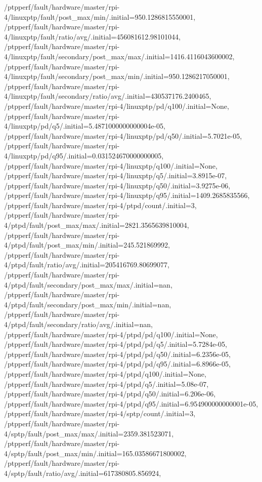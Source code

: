 {    /ptpperf/fault/hardware/master/rpi-4/linuxptp/fault/post_max/min/.initial=950.1286815550001,
    /ptpperf/fault/hardware/master/rpi-4/linuxptp/fault/ratio/avg/.initial=456081612.98101044,
    /ptpperf/fault/hardware/master/rpi-4/linuxptp/fault/secondary/post_max/max/.initial=1416.4116043600002,
    /ptpperf/fault/hardware/master/rpi-4/linuxptp/fault/secondary/post_max/min/.initial=950.1286217050001,
    /ptpperf/fault/hardware/master/rpi-4/linuxptp/fault/secondary/ratio/avg/.initial=430537176.2400465,
    /ptpperf/fault/hardware/master/rpi-4/linuxptp/pd/q100/.initial=None,
    /ptpperf/fault/hardware/master/rpi-4/linuxptp/pd/q5/.initial=5.4871000000000004e-05,
    /ptpperf/fault/hardware/master/rpi-4/linuxptp/pd/q50/.initial=5.7021e-05,
    /ptpperf/fault/hardware/master/rpi-4/linuxptp/pd/q95/.initial=0.031524670000000005,
    /ptpperf/fault/hardware/master/rpi-4/linuxptp/q100/.initial=None,
    /ptpperf/fault/hardware/master/rpi-4/linuxptp/q5/.initial=3.8915e-07,
    /ptpperf/fault/hardware/master/rpi-4/linuxptp/q50/.initial=3.9275e-06,
    /ptpperf/fault/hardware/master/rpi-4/linuxptp/q95/.initial=1409.2685835566,
    /ptpperf/fault/hardware/master/rpi-4/ptpd/count/.initial=3,
    /ptpperf/fault/hardware/master/rpi-4/ptpd/fault/post_max/max/.initial=2821.3565639810004,
    /ptpperf/fault/hardware/master/rpi-4/ptpd/fault/post_max/min/.initial=245.521869992,
    /ptpperf/fault/hardware/master/rpi-4/ptpd/fault/ratio/avg/.initial=205416769.80699077,
    /ptpperf/fault/hardware/master/rpi-4/ptpd/fault/secondary/post_max/max/.initial=nan,
    /ptpperf/fault/hardware/master/rpi-4/ptpd/fault/secondary/post_max/min/.initial=nan,
    /ptpperf/fault/hardware/master/rpi-4/ptpd/fault/secondary/ratio/avg/.initial=nan,
    /ptpperf/fault/hardware/master/rpi-4/ptpd/pd/q100/.initial=None,
    /ptpperf/fault/hardware/master/rpi-4/ptpd/pd/q5/.initial=5.7284e-05,
    /ptpperf/fault/hardware/master/rpi-4/ptpd/pd/q50/.initial=6.2356e-05,
    /ptpperf/fault/hardware/master/rpi-4/ptpd/pd/q95/.initial=6.8966e-05,
    /ptpperf/fault/hardware/master/rpi-4/ptpd/q100/.initial=None,
    /ptpperf/fault/hardware/master/rpi-4/ptpd/q5/.initial=5.08e-07,
    /ptpperf/fault/hardware/master/rpi-4/ptpd/q50/.initial=6.206e-06,
    /ptpperf/fault/hardware/master/rpi-4/ptpd/q95/.initial=6.954900000000001e-05,
    /ptpperf/fault/hardware/master/rpi-4/sptp/count/.initial=3,
    /ptpperf/fault/hardware/master/rpi-4/sptp/fault/post_max/max/.initial=2359.381523071,
    /ptpperf/fault/hardware/master/rpi-4/sptp/fault/post_max/min/.initial=165.03586671800002,
    /ptpperf/fault/hardware/master/rpi-4/sptp/fault/ratio/avg/.initial=617380805.856924,
}
